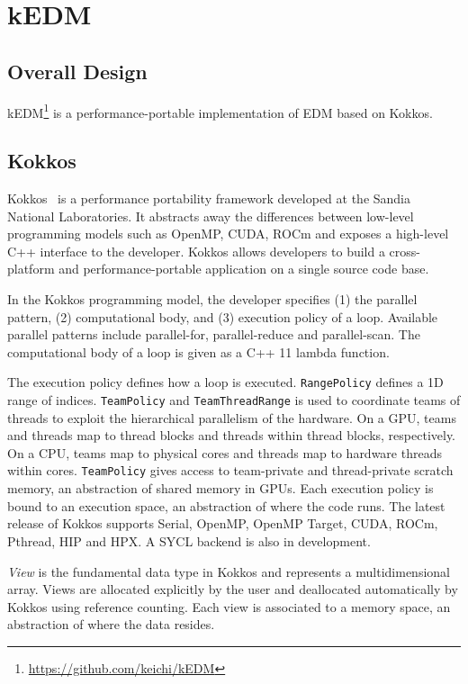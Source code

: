 \documentclass[conference]{IEEEtran}
\begin{document}
\section{kEDM}\label{sec:proposal}

\subsection{Overall Design}

kEDM\footnote{\url{https://github.com/keichi/kEDM}} is a performance-portable
implementation of EDM based on Kokkos.

\subsection{Kokkos}

Kokkos~\cite{Edwards2014} is a performance portability framework developed at
the Sandia National Laboratories. It abstracts away the differences between
low-level programming models such as OpenMP, CUDA, ROCm and exposes a
high-level C++ interface to the developer. Kokkos allows developers to build a
cross-platform and performance-portable application on a single source code
base.

In the Kokkos programming model, the developer specifies (1) the parallel
pattern, (2) computational body, and (3) execution policy of a loop. Available
parallel patterns include parallel-for, parallel-reduce and parallel-scan. The
computational body of a loop is given as a C++ 11 lambda function.

The execution policy defines how a loop is executed. \texttt{RangePolicy}
defines a 1D range of indices. \texttt{TeamPolicy} and \texttt{TeamThreadRange}
is used to coordinate teams of threads to exploit the hierarchical parallelism
of the hardware. On a GPU, teams and threads map to thread blocks and threads
within thread blocks, respectively. On a CPU, teams map to physical cores and
threads map to hardware threads within cores. \texttt{TeamPolicy} gives access
to team-private and thread-private scratch memory, an abstraction of shared
memory in GPUs. Each execution policy is bound to an execution space, an
abstraction of where the code runs. The latest release of Kokkos supports
Serial, OpenMP, OpenMP Target, CUDA, ROCm, Pthread, HIP and HPX\@. A SYCL
backend is also in development.

\textit{View} is the fundamental data type in Kokkos and represents a
multidimensional array. Views are allocated explicitly by the user and
deallocated automatically by Kokkos using reference counting.
Each view is associated to a memory space, an abstraction of
where the data resides.
\end{document}
